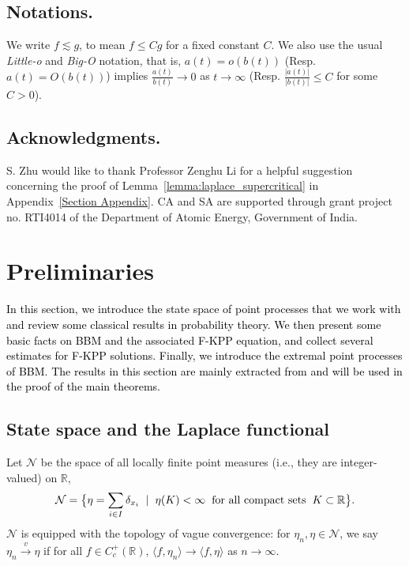 \documentclass[a4paper,reqno]{amsart}%
\newcommand{\1}{\mathbf 1}
\theoremstyle{mine}
\numberwithin{theorem}{section}
\numberwithin{equation}{section}
\theoremstyle{remark}
\begin{document}
\subsection{Notations.}
We write $f \lesssim g$, to mean $f \le C g$ for a fixed constant $C.$
We also use the usual \textit{Little-o} and \textit{Big-O} notation, that is, $a(t)=o(b(t))$ (Resp. $a(t)=O(b(t))$) implies $\frac{a(t)}{b(t)} \to 0$ as $t \to \infty$ (Resp. $\frac{|a(t)|}{|b(t)|} \le C$ for some $C>0$).




\subsection{Acknowledgments.}
S. Zhu would like to thank Professor Zenghu Li for a helpful suggestion concerning the proof of Lemma~\ref{lemma:laplace_supercritical}
in Appendix~\ref{Section Appendix}. CA and SA are supported through grant project no. RTI4014 of the Department of Atomic Energy, Government of India.







\section{Preliminaries} \label{Section_Prelim}

\textcolor{black}{In this section, we introduce the state space of point processes that we work with and review some classical results in probability theory. We then present some basic facts on BBM and the associated F-KPP equation, and collect several estimates for F-KPP solutions. Finally, we introduce the extremal point processes of BBM. The results in this section are mainly extracted from \cite{Bramson78, Bramson83, ABK13, ABBS13, Bovier_book, Shekhar_Domain} and will be used in the proof of the main theorems.}

\subsection{State space and the Laplace functional} \label{Section Laplace}

Let $\mathcal{N}$ be the space of all locally finite point measures (i.e., they are integer-valued) on $\mathbb{R}$,  
 \[\mathcal{N} = \bigl\{ \eta = \sum_{i \in I} \delta_{x_i} \hspace{2mm}|\hspace{2mm} \eta(K) <\infty \hspace{2mm} \textrm{for all compact sets} \hspace{2mm} K\subset \mathbb{R}\bigr\}.\]
$\mathcal{N}$ is equipped with the topology of vague convergence: for $\eta_n, \eta \in \mathcal N$, we say $\eta_n \stackrel{v}{\rightarrow} \eta$ if for all $f \in C_c^+(\mathbb R)$, $\langle f,\eta_n\rangle \to \langle f,\eta\rangle$ as $n\to\infty$.
\end{document}
